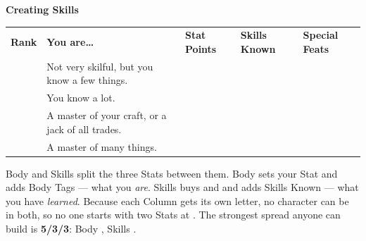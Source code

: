 \begin{strip}
  \begingroup\centering
  {\hdfont\Large\bfseries\color{\realmaccent} Creating Skills\par}
  \vspace{10pt}
  \endgroup
  \begingroup
  \setlength{\tabcolsep}{7pt}\renewcommand{\arraystretch}{1.35}
  \centering\begin{tabularx}{\textwidth}{@{}>{\centering\arraybackslash}p{1.6cm} Y >{\centering\arraybackslash}p{2.1cm} >{\centering\arraybackslash}p{2.1cm} >{\centering\arraybackslash}p{1.6cm}@{}}
  \rowcolor{\realmaccent}
  {\leavevmode\hdfont\bfseries\color{white}Rank} &
  {\leavevmode\hdfont\bfseries\color{white}You are\ldots} &
  {\leavevmode\hdfont\bfseries\color{white}Stat Points} &
  {\leavevmode\hdfont\bfseries\color{white}Skills Known} &
  {\leavevmode\hdfont\bfseries\color{white}Special Feats} \\
   & Not very skilful, but you know a few things.
    &  &  &  \\
   & You know a lot.
    &  &  &  \\
   & A master of your craft, or a jack of all trades.
    &  &  &  \\
   & A master of many things.
    &  &  &  \\
  \end{tabularx}
  \endgroup
\end{strip}

\begin{notebox}
Body and Skills split the three Stats between them. Body sets your
 Stat and adds Body Tags --- what you \emph{are}. Skills
buys  and  and adds Skills Known --- what
you have \emph{learned}. Because each Column gets its own letter, no
character can be  in both, so no one starts with two Stats
at . The strongest spread anyone can build is
\textbf{5/3/3}: Body , Skills .
\end{notebox}

\begin{readaloud}
\lipsum[19][1-3]
\end{readaloud}

